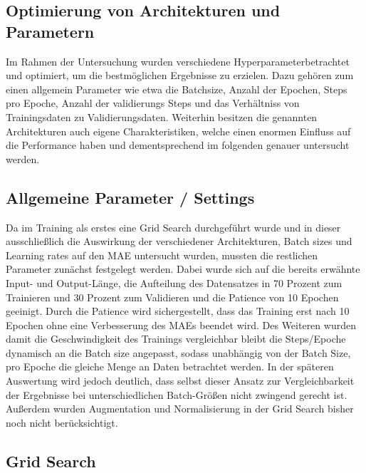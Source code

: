 \documentclass[acmtog, authorversion]{acmart} %
\begin{document}
\subsection{Optimierung von Architekturen und Parametern}

Im Rahmen der Untersuchung wurden verschiedene Hyperparameterbetrachtet und optimiert, um die bestmöglichen Ergebnisse zu erzielen.
Dazu gehören zum einen allgemein Parameter wie etwa die Batchsize, Anzahl der Epochen, Steps pro Epoche, Anzahl der validierungs Steps und das Verhältniss von Trainingsdaten zu Validierungsdaten.
Weiterhin besitzen die genannten Architekturen auch eigene Charakteristiken, welche einen enormen Einfluss auf die Performance haben und dementsprechend im folgenden genauer untersucht werden.

\subsection{Allgemeine Parameter / Settings}

Da im Training als erstes eine Grid Search durchgeführt wurde und in dieser ausschließlich die Auswirkung der verschiedener Architekturen, Batch sizes und Learning rates auf den MAE untersucht wurden, mussten die restlichen Parameter zunächst festgelegt werden. Dabei wurde sich auf die bereits erwähnte Input- und Output-Länge, die Aufteilung des Datensatzes in 70 Prozent zum Trainieren und 30 Prozent zum Validieren und die Patience von 10 Epochen geeinigt. Durch die Patience wird sichergestellt, dass das Training erst nach 10 Epochen ohne eine Verbesserung des MAEs beendet wird. Des Weiteren wurden damit die Geschwindigkeit des Trainings vergleichbar bleibt die Steps/Epoche dynamisch an die Batch size angepasst, sodass unabhängig von der Batch Size, pro Epoche die gleiche Menge an Daten betrachtet werden. In der späteren Auswertung wird jedoch deutlich, dass selbst dieser Ansatz zur Vergleichbarkeit der Ergebnisse bei unterschiedlichen Batch-Größen nicht zwingend gerecht ist. Außerdem wurden Augmentation und Normalisierung in der Grid Search bisher noch nicht berücksichtigt.


\subsection{Grid Search}
\end{document}
